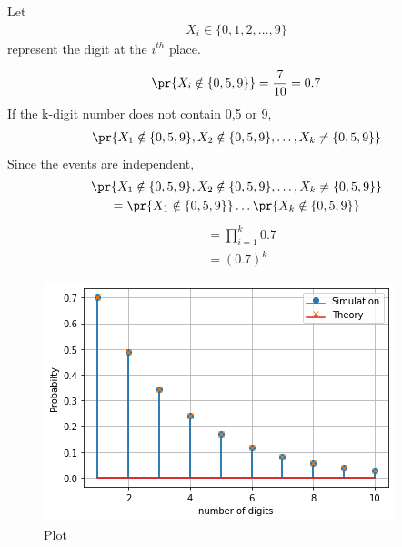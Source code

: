 Let 
\begin{align}
X_{i}\in \{0,1,2, \ldots ,9\}
\end{align}
represent the digit at the $i^{th}$ place.

\begin{align}
\pr{X_i \notin \{0,5,9\}}=\frac{7}{10}=0.7     
\end{align}
If the k-digit number does not contain 0,5 or 9,
\begin{align}
\pr{X_{1} \notin \{0,5,9\} ,X_{2} \notin \{0,5,9\} ,\ldots, X_{k} \neq \{0,5,9\}  }
\end{align}
Since the events are independent, 
\begin{multline}\label{3:eq1}
  \pr{X_{1} \notin \{0,5,9\} ,X_{2} \notin \{0,5,9\} ,\ldots, X_{k} \neq \{0,5,9\}  }\\
  =  \pr{X_1 \notin \{0,5,9\}}\ldots\pr{X_k \notin \{0,5,9\}}
\end{multline}
\begin{align}
&=\prod_{i=1}^{k} 0.7\\
&=(0.7)^{k}
\end{align}

\begin{figure}[h!]
    \centering
    \includegraphics[width=\linewidth]{figs/3.png}
    \caption{Plot  }
    \label{3:}
\end{figure}